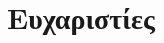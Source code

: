 \chapter*{Ευχαριστίες}

\pagestyle{fancy}
\fancyfoot[RO]{\thepage}
\fancyfoot[LE]{\thepage}

\lipsum